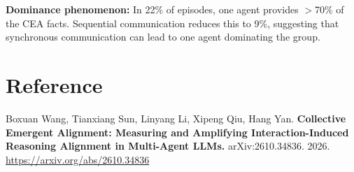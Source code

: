 \documentclass[10pt,twocolumn]{article}
\begin{document}
\textbf{Dominance phenomenon:} In 22\% of episodes, one agent
provides $>$70\% of the CEA facts. Sequential communication
reduces this to 9\%, suggesting that synchronous communication
can lead to one agent dominating the group.

\section*{Reference}

Boxuan Wang, Tianxiang Sun, Linyang Li, Xipeng Qiu, Hang Yan.
\textbf{Collective Emergent Alignment: Measuring and Amplifying
Interaction-Induced Reasoning Alignment in Multi-Agent LLMs.}
arXiv:2610.34836. 2026.
\url{https://arxiv.org/abs/2610.34836}
\end{document}
